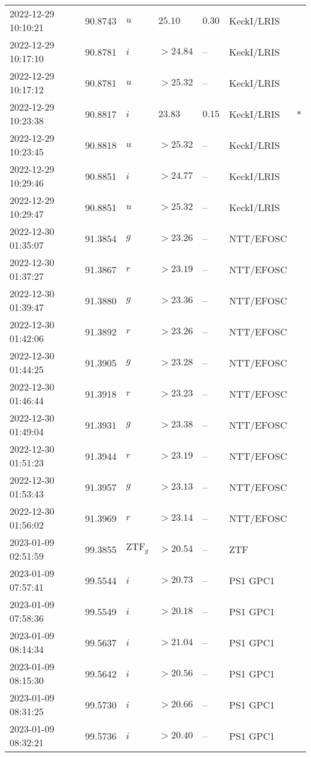 \documentclass{nature_plusfigure}
\begin{document}
\begin{supplement}
\begin{center}
\begin{longtable}{lllllll}
2022-12-29 10:10:21 & 90.8743 & $u$ & $25.10$ & $0.30$ & KeckI/LRIS &  \\ 
2022-12-29 10:17:10 & 90.8781 & $i$ & $>24.84$ & -- & KeckI/LRIS &  \\ 
2022-12-29 10:17:12 & 90.8781 & $u$ & $>25.32$ & -- & KeckI/LRIS &  \\ 
2022-12-29 10:23:38 & 90.8817 & $i$ & $23.83$ & $0.15$ & KeckI/LRIS & * \\ 
2022-12-29 10:23:45 & 90.8818 & $u$ & $>25.32$ & -- & KeckI/LRIS &  \\ 
2022-12-29 10:29:46 & 90.8851 & $i$ & $>24.77$ & -- & KeckI/LRIS &  \\ 
2022-12-29 10:29:47 & 90.8851 & $u$ & $>25.32$ & -- & KeckI/LRIS &  \\ 
2022-12-30 01:35:07 & 91.3854 & $g$ & $>23.26$ & -- & NTT/EFOSC &  \\ 
2022-12-30 01:37:27 & 91.3867 & $r$ & $>23.19$ & -- & NTT/EFOSC &  \\ 
2022-12-30 01:39:47 & 91.3880 & $g$ & $>23.36$ & -- & NTT/EFOSC &  \\ 
2022-12-30 01:42:06 & 91.3892 & $r$ & $>23.26$ & -- & NTT/EFOSC &  \\ 
2022-12-30 01:44:25 & 91.3905 & $g$ & $>23.28$ & -- & NTT/EFOSC &  \\ 
2022-12-30 01:46:44 & 91.3918 & $r$ & $>23.23$ & -- & NTT/EFOSC &  \\ 
2022-12-30 01:49:04 & 91.3931 & $g$ & $>23.38$ & -- & NTT/EFOSC &  \\ 
2022-12-30 01:51:23 & 91.3944 & $r$ & $>23.19$ & -- & NTT/EFOSC &  \\ 
2022-12-30 01:53:43 & 91.3957 & $g$ & $>23.13$ & -- & NTT/EFOSC &  \\ 
2022-12-30 01:56:02 & 91.3969 & $r$ & $>23.14$ & -- & NTT/EFOSC &  \\ 
2023-01-09 02:51:59 & 99.3855 & $\mathrm{ZTF}_{g}$ & $>20.54$ & -- & ZTF &  \\ 
2023-01-09 07:57:41 & 99.5544 & $i$ & $>20.73$ & -- & PS1 GPC1 &  \\ 
2023-01-09 07:58:36 & 99.5549 & $i$ & $>20.18$ & -- & PS1 GPC1 &  \\ 
2023-01-09 08:14:34 & 99.5637 & $i$ & $>21.04$ & -- & PS1 GPC1 &  \\ 
2023-01-09 08:15:30 & 99.5642 & $i$ & $>20.56$ & -- & PS1 GPC1 &  \\ 
2023-01-09 08:31:25 & 99.5730 & $i$ & $>20.66$ & -- & PS1 GPC1 &  \\ 
2023-01-09 08:32:21 & 99.5736 & $i$ & $>20.40$ & -- & PS1 GPC1 &  \\ 

\end{longtable}
\end{center}
\end{supplement}
\end{document}
